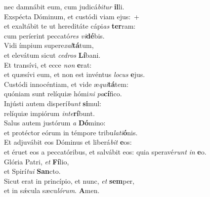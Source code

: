 \oddverse nec damnábit eum, cum judicá\textit{bi}\textit{tur} \textbf{il}li.\\
\evenverse Exspécta Dóminum, et custódi viam ejus:~+\\
\evenverse  et exaltábit te ut hereditáte cápi\textit{as} \textbf{ter}ram:~\*\\
\evenverse cum períerint peccató\textit{res} \textit{vi}\textbf{dé}bis.\\
\oddverse Vidi ímpium supere\textit{xal}\textbf{tá}tum,~\*\\
\oddverse et elevátum sicut \textit{ce}\textit{dros} \textbf{Lí}bani.\\
\evenverse Et transívi, et ecce \textit{non} \textbf{e}rat:~\*\\
\evenverse et quæsívi eum, et non est invéntus \textit{lo}\textit{cus} \textbf{e}jus.\\
\oddverse Custódi innocéntiam, et vide æ\textit{qui}\textbf{tá}tem:~\*\\
\oddverse quóniam sunt relíquiæ hómi\textit{ni} \textit{pa}\textbf{cí}fico.\\
\evenverse Injústi autem disperí\textit{bunt} \textbf{si}mul:~\*\\
\evenverse relíquiæ impiórum \textit{in}\textit{te}\textbf{rí}bunt.\\
\oddverse Salus autem justórum \textit{a} \textbf{Dó}mino:~\*\\
\oddverse et protéctor eórum in témpore tribu\textit{la}\textit{ti}\textbf{ó}nis.\\
\evenverse Et adjuvábit eos Dóminus et liberá\textit{bit} \textbf{e}os:~\*\\
\evenverse et éruet eos a peccatóribus, et salvábit eos: quia speravé\textit{runt} \textit{in} \textbf{e}o.\\
\oddverse Glória Patri, \textit{et} \textbf{Fí}lio,~\*\\
\oddverse et Spirí\textit{tu}\textit{i} \textbf{San}cto.\\
\evenverse Sicut erat in princípio, et nunc, \textit{et} \textbf{sem}per,~\*\\
\evenverse et in sǽcula sæcu\textit{ló}\textit{rum}. \textbf{A}men.\\
